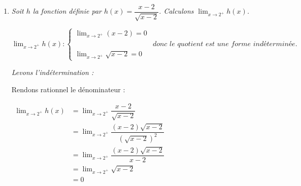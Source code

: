 \documentclass[12pt,a4paper]{article}
\begin{document}
\begin{enumerate}
    \textit{Levons l'indétermination :}
    
    Utilisons l'expression conjuguée du numérateur :
    
    $
    \begin{aligned}
    \displaystyle \lim_{x \to 1} g(x) &= \displaystyle \lim_{x \to 1} \dfrac{\sqrt{x + 3} - 2}{x - 1}\\
    &= \displaystyle \lim_{x \to 1} \dfrac{(\sqrt{x + 3} - 2)(\sqrt{x + 3} + 2)}{(x - 1)(\sqrt{x + 3} + 2)}\\
    &= \displaystyle \lim_{x \to 1} \dfrac{(\sqrt{x + 3})^2 - 2^2}{(x - 1)(\sqrt{x + 3} + 2)}\\
    &= \displaystyle \lim_{x \to 1} \dfrac{x + 3 - 4}{(x - 1)(\sqrt{x + 3} + 2)}\\
    &= \displaystyle \lim_{x \to 1} \dfrac{x - 1}{(x - 1)(\sqrt{x + 3} + 2)}\\
    &= \displaystyle \lim_{x \to 1} \dfrac{1}{\sqrt{x + 3} + 2}\\
    &= \frac{1}{\sqrt{1 + 3} + 2}\\
    &= \frac{1}{4}
    \end{aligned}
    $
    
     

    \vspace{0.6cm}

    \item \textit{Soit $h$ la fonction définie par $h(x) = \dfrac{x - 2}{\sqrt{x - 2}}$. Calculons $\displaystyle \lim_{x \to 2^+} h(x)$.}
    
    \vspace{0.1cm}
    
    $
    \displaystyle \lim_{x \to 2^+} h(x):
    \begin{cases}
    \displaystyle \lim_{x \to 2^+} (x - 2) = 0\\[3mm]
    &\textit{donc le quotient est une forme indéterminée.}\\
    \displaystyle \lim_{x \to 2^+} \sqrt{x - 2} = 0
    \end{cases}
    $

    \textit{Levons l'indétermination :}
    
    Rendons rationnel le dénominateur :
    
    $
    \begin{aligned}
    \displaystyle \lim_{x \to 2^+} h(x) &= \displaystyle \lim_{x \to 2^+} \dfrac{x - 2}{\sqrt{x - 2}}\\
    &= \displaystyle \lim_{x \to 2^+} \dfrac{(x - 2)\sqrt{x - 2}}{(\sqrt{x - 2})^2}\\
    &= \displaystyle \lim_{x \to 2^+} \dfrac{(x - 2)\sqrt{x - 2}}{x - 2}\\
    &= \displaystyle \lim_{x \to 2^+} \sqrt{x - 2}\\
    &= 0
    \end{aligned}
    $
    
     
\end{enumerate}
\end{document}
